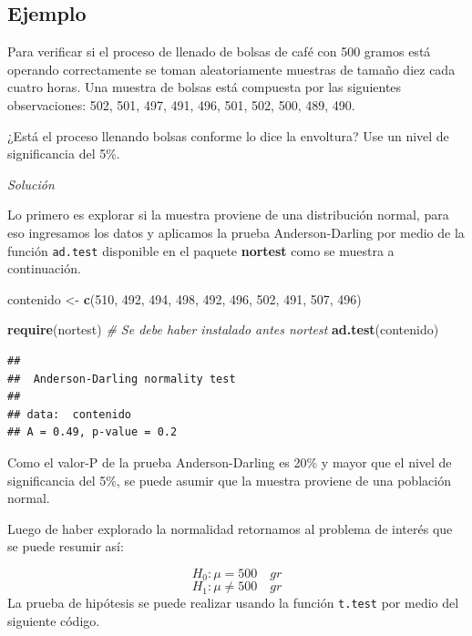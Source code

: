 \documentclass[10pt,]{krantz}
\makeatletter
\newenvironment{Shaded}{\begin{snugshade}}{\end{snugshade}}
\newcommand{\KeywordTok}[1]{\textcolor[rgb]{0.13,0.29,0.53}{\textbf{#1}}}
\newcommand{\DecValTok}[1]{\textcolor[rgb]{0.00,0.00,0.81}{#1}}
\newcommand{\StringTok}[1]{\textcolor[rgb]{0.31,0.60,0.02}{#1}}
\newcommand{\CommentTok}[1]{\textcolor[rgb]{0.56,0.35,0.01}{\textit{#1}}}
\newcommand{\NormalTok}[1]{#1}
\newenvironment{kframe}{%
\medskip{}
\setlength{\fboxsep}{.8em}
 \def\at@end@of@kframe{}%
 \ifinner\ifhmode%
  \def\at@end@of@kframe{\end{minipage}}%
  \begin{minipage}{\columnwidth}%
 \fi\fi%
 \def\FrameCommand##1{\hskip\@totalleftmargin \hskip-\fboxsep
 \colorbox{shadecolor}{##1}\hskip-\fboxsep
     \hskip-\linewidth \hskip-\@totalleftmargin \hskip\columnwidth}%
 \MakeFramed {\advance\hsize-\width
   \@totalleftmargin\z@ \linewidth\hsize
   \@setminipage}}%
 {\par\unskip\endMakeFramed%
 \at@end@of@kframe}
\renewenvironment{Shaded}{\begin{kframe}}{\end{kframe}}
\makeatother
\begin{document}
\subsection*{Ejemplo}\label{ejemplo-62}


Para verificar si el proceso de llenado de bolsas de café con 500 gramos
está operando correctamente se toman aleatoriamente muestras de tamaño
diez cada cuatro horas. Una muestra de bolsas está compuesta por las
siguientes observaciones: 502, 501, 497, 491, 496, 501, 502, 500, 489,
490.

¿Está el proceso llenando bolsas conforme lo dice la envoltura? Use un
nivel de significancia del 5\%.

\emph{Solución}

Lo primero es explorar si la muestra proviene de una distribución
normal, para eso ingresamos los datos y aplicamos la prueba
Anderson-Darling por medio de la función \texttt{ad.test} disponible en
el paquete \textbf{nortest} \citep{R-nortest} como se muestra a
continuación.

\begin{Shaded}
\begin{Highlighting}[]
\NormalTok{contenido <-}\StringTok{ }\KeywordTok{c}\NormalTok{(}\DecValTok{510}\NormalTok{, }\DecValTok{492}\NormalTok{, }\DecValTok{494}\NormalTok{, }\DecValTok{498}\NormalTok{, }\DecValTok{492}\NormalTok{,}
               \DecValTok{496}\NormalTok{, }\DecValTok{502}\NormalTok{, }\DecValTok{491}\NormalTok{, }\DecValTok{507}\NormalTok{, }\DecValTok{496}\NormalTok{) }

\KeywordTok{require}\NormalTok{(nortest) }\CommentTok{# Se debe haber instalado antes nortest}
\KeywordTok{ad.test}\NormalTok{(contenido)}
\end{Highlighting}
\end{Shaded}

\begin{verbatim}
## 
##  Anderson-Darling normality test
## 
## data:  contenido
## A = 0.49, p-value = 0.2
\end{verbatim}

Como el valor-P de la prueba Anderson-Darling es 20\% y mayor que el
nivel de significancia del 5\%, se puede asumir que la muestra proviene
de una población normal.

Luego de haber explorado la normalidad retornamos al problema de interés
que se puede resumir así:

\[H_0: \mu = 500 \quad gr\] \[H_1: \mu \neq 500 \quad gr\] La prueba de
hipótesis se puede realizar usando la función \texttt{t.test} por medio
del siguiente código.
\end{document}
